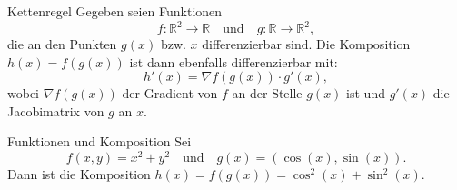\documentclass{beamer}
\begin{document}
    \begin{frame}
        \begin{block}{Kettenregel}
            Gegeben seien Funktionen
            \[
            f : \mathbb{R}^2 \rightarrow \mathbb{R} \quad \text{und} \quad g : \mathbb{R} \rightarrow \mathbb{R}^2,
            \]
            die an den Punkten \( g(x) \) bzw. \( x \) differenzierbar sind. Die Komposition \( h(x) = f(g(x)) \) ist dann ebenfalls differenzierbar mit:
            \[
            h'(x) = \nabla f(g(x)) \cdot g'(x),
            \]
            wobei \( \nabla f(g(x)) \) der Gradient von \( f \) an der Stelle \( g(x) \) ist und \( g'(x) \) die Jacobimatrix von \( g \) an \( x \).
        \end{block}
    \end{frame}
    
    \begin{frame}
        \begin{block}{Funktionen und Komposition}
            Sei
            \[
            f(x, y) = x^2 + y^2 \quad \text{und} \quad g(x) = (\cos(x), \sin(x)).
            \]
            Dann ist die Komposition \( h(x) = f(g(x)) = \cos^2(x) + \sin^2(x) \).
        \end{block}
    \end{frame}
    
\end{document}
